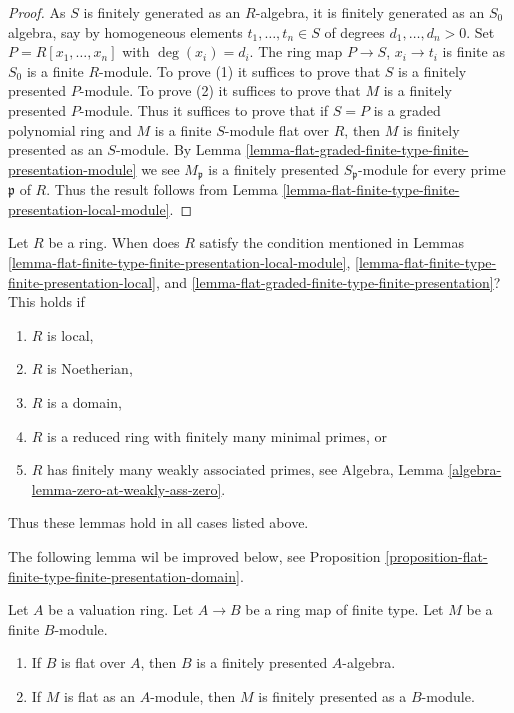 \begin{proof}
As $S$ is finitely generated as an $R$-algebra, it is finitely generated
as an $S_0$ algebra, say by homogeneous elements $t_1, \ldots, t_n \in S$
of degrees $d_1, \ldots, d_n > 0$. Set $P = R[x_1, \ldots, x_n]$ with
$\deg(x_i) = d_i$. The ring map $P \to S$, $x_i \to t_i$ is finite
as $S_0$ is a finite $R$-module. To prove (1) it suffices to prove
that $S$ is a finitely presented $P$-module.  To prove (2) it suffices
to prove that $M$ is a finitely presented $P$-module. Thus it suffices
to prove that if $S = P$ is a graded polynomial ring and $M$ is a finite
$S$-module flat over $R$, then $M$ is finitely presented as an $S$-module. By
Lemma \ref{lemma-flat-graded-finite-type-finite-presentation-module}
we see $M_{\mathfrak p}$ is a finitely presented $S_{\mathfrak p}$-module
for every prime $\mathfrak p$ of $R$. Thus the result follows from
Lemma \ref{lemma-flat-finite-type-finite-presentation-local-module}.
\end{proof}

\begin{remark}
\label{remark-when-does-condition-hold}
Let $R$ be a ring. When does $R$ satisfy the condition mentioned in
Lemmas \ref{lemma-flat-finite-type-finite-presentation-local-module},
\ref{lemma-flat-finite-type-finite-presentation-local}, and
\ref{lemma-flat-graded-finite-type-finite-presentation}?
This holds if
\begin{enumerate}
\item $R$ is local,
\item $R$ is Noetherian,
\item $R$ is a domain,
\item $R$ is a reduced ring with finitely many minimal primes, or
\item $R$ has finitely many weakly associated primes, see
Algebra, Lemma \ref{algebra-lemma-zero-at-weakly-ass-zero}.
\end{enumerate}
Thus these lemmas hold in all cases listed above.
\end{remark}

\noindent
The following lemma wil be improved below, see
Proposition \ref{proposition-flat-finite-type-finite-presentation-domain}.

\begin{lemma}
\label{lemma-flat-finite-type-valuation-ring-finite-presentation}
Let $A$ be a valuation ring. Let $A \to B$ be a ring map of finite type.
Let $M$ be a finite $B$-module.
\begin{enumerate}
\item If $B$ is flat over $A$, then $B$ is a finitely presented $A$-algebra.
\item If $M$ is flat as an $A$-module, then $M$ is finitely presented
as a $B$-module.
\end{enumerate}
\end{lemma}

